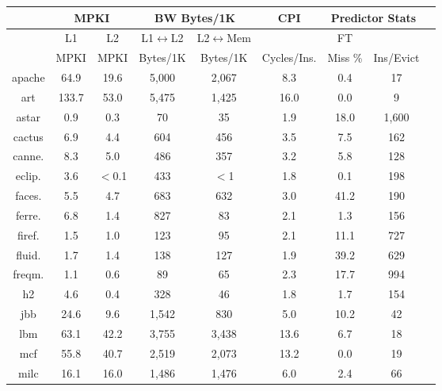 \begin{table}[h]
\centering
	\begin{tabular}{|c|c|c|c|c|c|c|c|c|}
	\hline
	 & \multicolumn{2}{c|}{MPKI} &  \multicolumn{2}{c|}{BW Bytes/1K} & CPI & \multicolumn{2}{c|}{Predictor Stats}  \\
	\hline
	          & L1        & L2    & L1$\longleftrightarrow$L2 & L2$\longleftrightarrow$Mem & & FT &  \\
	          & MPKI & MPKI & Bytes/1K & Bytes/1K & Cycles/Ins. & Miss \% &  Ins/Evict\\
	\hline
	apache    &    64.9 & 19.6    &    5,000  &    2,067         &  8.3  & 0.4 &   17 \\
	art       &    133.7  &    53.0    &    5,475  &    1,425    &  16.0 & 0.0 &   9 \\
	astar     &    0.9    &    0.3     &    70     &    35       &  1.9  & 18.0 &  1,600 \\
	cactus    &    6.9    &    4.4     &    604    &    456      &  3.5  & 7.5 &   162 \\
	canne.    &    8.3    &    5.0     &    486    &    357      &  3.2  & 5.8 &   128 \\
	eclip.    &    3.6    &    $<$0.1  &    433    &    $<$1     &  1.8  & 0.1 &   198 \\
	faces.    &    5.5    &    4.7     &    683    &    632      &  3.0  & 41.2 &  190 \\
	ferre.    &    6.8    &    1.4     &    827    &    83       &  2.1  & 1.3 &   156 \\
	firef.    &    1.5    &    1.0     &    123    &    95       &  2.1  & 11.1 &  727 \\
	fluid.    &    1.7    &    1.4     &    138    &    127      &  1.9  & 39.2 &  629 \\
	freqm.    &    1.1    &    0.6     &    89     &    65       &  2.3  & 17.7 &  994 \\
	h2        &    4.6    &    0.4     &    328    &    46       &  1.8  & 1.7 &   154 \\
	jbb       &    24.6   &    9.6     &    1,542  &    830      &  5.0  & 10.2 &  42 \\
	lbm       &    63.1   &    42.2    &    3,755  &    3,438    &  13.6 & 6.7 &   18 \\
	mcf       &    55.8   &    40.7    &    2,519  &    2,073    &  13.2 & 0.0 &   19 \\
	milc      &    16.1   &    16.0    &    1,486  &    1,476    &  6.0  & 2.4 &   66 \\

\end{tabular}
\end{table}
